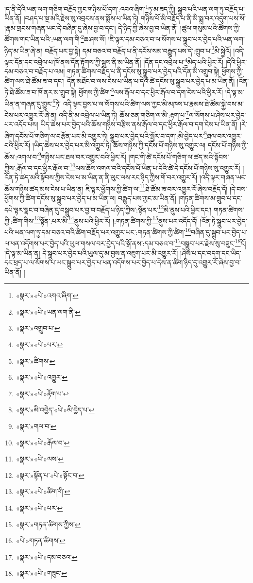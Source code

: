 །ད་ནི་དེའི་ཡན་ལག་གཅིག་བརྗོད་ཀྱང་གཉིས་པོ་དག་:འབའ་ཞིག་\footnote{«སྣར་»«པེ་»འགའ་ཞིག་}ཏུ་མ་ཟད་ཀྱི། སྒྲུབ་པའི་ཡན་ལག་ཏུ་བརྗོད་པ་ཡིན་ནོ། །བཤད་པ་སྔ་མའི་རྗེས་སུ་འབྲངས་ནས་སྨོས་པ་ཡིན་ཏེ། གཉིས་པོ་མི་བརྗོད་པ་ནི་མི་སྨྲ་བར་འདུག་པས་སོ། །རྣམ་གྲངས་གཞན་ཡང་དེ་བཞིན་དུ་ཞེས་བྱ་བ་དང་། དེ་ཉིད་ཀྱི་ཞེས་བྱ་བ་ཡིན་ནོ། །ཚུལ་གསུམ་པའི་ཚོགས་ཀྱི་ཚོགས་གང་ཡིན་པའི་:ཡན་ལག་གི་\footnote{«སྣར་»«པེ་»ཡན་ལག་ནི་}ཆ་ཤས་སོ། །ཇི་ལྟར་དམ་བཅའ་བ་ལ་སོགས་པ་སྒྲུབ་པར་བྱེད་པའི་ཡན་ལག་ཉིད་མ་ཡིན་ཞེ་ན། བརྗོད་པར་བྱ་སྟེ། དམ་བཅའ་བ་བརྗོད་པ་ནི་དངོས་སམ་བརྒྱུད་པས་དེ་:གྲུབ་པ་\footnote{«སྣར་»འགྲུབ་པ་}མི་སྐྱེའོ། །འདི་ལྟར་དོན་དང་འབྲེལ་པ་ཁོ་ནས་དོན་རྟོགས་ཀྱི་སྒྲས་ནི་མ་ཡིན་ནོ། །དོན་དང་འབྲེལ་པ་\footnote{«སྣར་»«པེ་»པར་}མེད་པའི་ཕྱིར་རོ། །དེའི་ཕྱིར་དམ་བཅའ་བ་བརྗོད་པ་འམ། གཏན་ཚིགས་བརྗོད་པ་ནི་དངོས་སུ་སྒྲུབ་པར་བྱེད་པའི་དོན་མི་འགྲུབ་སྟེ། ཕྱོགས་ཀྱི་ཚིག་ལས་ཐེ་ཚོམ་ཟ་བ་དང་། དོན་མཐོང་བ་ལས་ངེས་པ་ཡིན་པ་དེའི་ཚེ་དངོས་སུ་སྒྲུབ་པར་བྱེད་པ་མ་ཡིན་ནོ། །འོན་ཏེ་ཐེ་ཚོམ་ཟ་བ་ཁོ་ནར་མ་གྲུབ་སྟེ། ཕྱོགས་ཀྱི་ཚིག་\footnote{«སྣར་»ཚིགས་}ལས་རྒོལ་བ་དང་ཕྱིར་རྒོལ་བ་དག་ངེས་པའི་ཕྱིར་རོ། །དེ་ལྟ་མ་ཡིན་ན་གཞན་དུ་གྱུར་\footnote{«སྣར་»«པེ་»འགྱུར་}ཏེ། འདི་ལྟར་བྱས་པ་ལ་སོགས་པའི་ཚིག་ལས་ཀྱང་མི་མཁས་པ་རྣམས་ཐེ་ཚོམ་སྐྱེ་བས་མ་ངེས་པར་འགྱུར་རོ་ཞེ་ན། འདི་ནི་མ་འབྲེལ་པ་ཡིན་ཏེ། ཆོས་ཅན་གཅིག་ལ་མི་:རྟག་པ་\footnote{«སྣར་»«པེ་»རྟོག་པ་}ལ་སོགས་པ་ཤེས་པར་བྱེད་པར་འདོད་པས། ཡིད་ཆེས་པར་བྱེད་པའི་ཆོས་གཉིས་བརྩིས་ནས་རྒོལ་བ་དང་ཕྱིར་རྒོལ་བ་དག་ངེས་པ་ཡིན་ནོ། །རེ་ཞིག་དངོས་པོ་གཅིག་ལ་བརྩོན་པར་མི་འགྱུར་ཏེ། སྒྲུབ་པར་བྱེད་པའི་སྦྱོར་བ་དག་:མི་བྱེད་པར་\footnote{«སྣར་»མི་འབྱེད་«པེ་»མི་བྱེད་པ་}ཐལ་བར་འགྱུར་བའི་ཕྱིར་རོ། །ཡིད་ཆེས་པར་བྱེད་པར་མི་འགྱུར་ཏེ། ཆོས་གཉིས་ཀྱི་དངོས་པོ་གཉིས་སུ་འགྱུར་ལ། དངོས་པོ་གཉིས་ཀྱི་ཆོས་:འགལ་བ་\footnote{«སྣར་»གལ་བ་}གཉིས་པར་ཐལ་བར་འགྱུར་བའི་ཕྱིར་རོ། །གང་གི་ཚེ་དངོས་པོ་གཅིག་ལ་ཚད་མའི་སྟོབས་ཀྱིས་:རྒོལ་བ་དང་ཕྱིར་རྒོལ་བ་\footnote{«སྣར་»«པེ་»རྒོལ་བ་}ལས་ཆོས་འགལ་བའི་དངོས་པོ་ཡིན་པ་དེའི་ཚེ་དེ་དངོས་པོ་གཉིས་སུ་འགྱུར་རོ། །འོན་ཏེ་ཚད་མའི་སྟོབས་ཀྱིས་ངེས་པ་མ་ཡིན་ན་ནི་ལུང་ལས་རང་ཉིད་ཀྱིས་གོ་བར་འགྱུར་རོ། །འདི་ལྟར་གཞན་ཡང་ཆོས་གཉིས་ཚད་མས་ངེས་པ་ཡིན་ན། ཇི་ལྟར་ཕྱོགས་ཀྱི་ཚིག་ལ་\footnote{«སྣར་»«པེ་»ལས་}ཐེ་ཚོམ་ཟ་བར་འགྱུར་རོ་ཞེས་བརྗོད་དོ། །དེ་བས་ཕྱོགས་ཀྱི་ཚིག་དངོས་སུ་སྒྲུབ་པར་བྱེད་པ་མ་ཡིན་ལ། བརྒྱུད་པས་ཀྱང་མ་ཡིན་ནོ། །གཏན་ཚིགས་མ་གྲུབ་པ་དང་དཔེ་ལྟར་སྣང་བ་བཞིན་དུ་བསྒྲུབ་པར་བྱ་བ་བརྗོད་པ་ཉིད་ཀྱིས་:སྟོན་པར་\footnote{«སྣར་»སྟོན་པ་«པེ་»སྟོང་བ་}མི་ནུས་པའི་ཕྱིར་དང་། གཏན་ཚིགས་ཀྱི་:ཚིག་གིས་\footnote{«སྣར་»«པེ་»ཚིག་གི་}སྟོན་:པར་མི་\footnote{«སྣར་»«པེ་»པར་}ནུས་པའི་ཕྱིར་རོ། །:གཏན་ཚིགས་ཀྱི་\footnote{«སྣར་»གཏན་ཚིགས་ཀྱིས་}ནུས་པར་འདོད་དོ། །འོན་ཏེ་སྒྲུབ་པར་བྱེད་པའི་ཡན་ལག་ཏུ་དམ་བཅའ་བའི་ཚིག་བརྗོད་པར་འགྱུར་ཡང་:གཏན་ཚིགས་ཀྱི་ཚིག་\footnote{«པེ་»གཏན་ཚིགས་}བཞིན་དུ་སྒྲུབ་པར་བྱེད་པ་ལ་ཕན་འདོགས་པར་བྱེད་པའི་ཡུལ་གསལ་བར་བྱེད་པའི་སྒོ་ནས་:དམ་བཅའ་བ་\footnote{«སྣར་»«པེ་»དམ་བཅའ་}བསྒྲུབ་པར་རྗེས་སུ་བཟུང་\footnote{«སྣར་»«པེ་»གཟུང་}ངོ། །དེ་ལྟ་མ་ཡིན་ན། དེ་སྒྲུབ་པར་བྱེད་པའི་ཡུལ་དུ་མ་བྱས་ན་འཇུག་པར་མི་འགྱུར་རོ། །ཤེས་པ་དང་བདག་དང་ཡིད་དང་ཕྲད་པ་ལ་སོགས་པ་ཡང་སྒྲུབ་པར་བྱེད་པ་ཕན་འདོགས་པར་བྱེད་པ་དེས་ན་ཚིག་ཉིད་དུ་འགྱུར་རོ་ཞེས་བྱ་བ་ཡིན་ནོ། །
